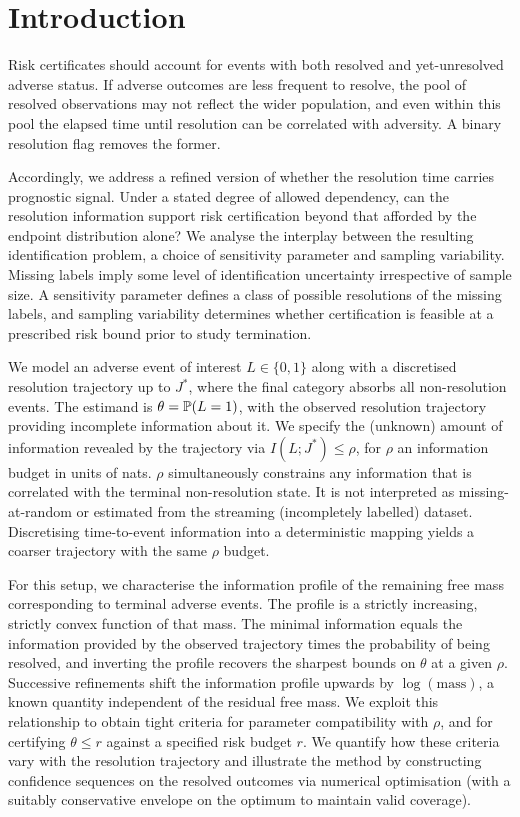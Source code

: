 \section{Introduction}\label{sec:intro} 
Risk certificates should account for events with both resolved and yet-unresolved adverse status. If adverse outcomes are less frequent to resolve, the pool of resolved observations may not reflect the wider population, and even within this pool the elapsed time until resolution can be correlated with adversity. A binary resolution flag removes the former. 

Accordingly, we address a refined version of whether the resolution time carries prognostic signal. Under a stated degree of allowed dependency, can the resolution information support risk certification beyond that afforded by the endpoint distribution alone? We analyse the interplay between the resulting identification problem, a choice of sensitivity parameter and sampling variability. Missing labels imply some level of identification uncertainty irrespective of sample size. A sensitivity parameter defines a class of possible resolutions of the missing labels, and sampling variability determines whether certification is feasible at a prescribed risk bound prior to study termination.

We model an adverse event of interest $L\in\{0,1\}$ along with a discretised resolution trajectory up to $J^*$, where the final category absorbs all non-resolution events. The estimand is $\theta = \mathbb P(L = 1)$, with the observed resolution trajectory providing incomplete information about it. We specify the (unknown) amount of information revealed by the trajectory via $I(L; J^*) \leq \rho$, for $\rho$ an information budget in units of nats. $\rho$ simultaneously constrains any information that is correlated with the terminal non-resolution state. It is not interpreted as missing-at-random or estimated from the streaming (incompletely labelled) dataset. Discretising time-to-event information into a deterministic mapping yields a coarser trajectory with the same $\rho$ budget.

For this setup, we characterise the information profile of the remaining free mass corresponding to terminal adverse events. The profile is a strictly increasing, strictly convex function of that mass. The minimal information equals the information provided by the observed trajectory times the probability of being resolved, and inverting the profile recovers the sharpest bounds on $\theta$ at a given $\rho$. Successive refinements shift the information profile upwards by $\log(\mathrm{mass})$, a known quantity independent of the residual free mass. We exploit this relationship to obtain tight criteria for parameter compatibility with $\rho$, and for certifying $\theta \leq r$ against a specified risk budget $r$. We quantify how these criteria vary with the resolution trajectory and illustrate the method by constructing confidence sequences on the resolved outcomes via numerical optimisation (with a suitably conservative envelope on the optimum to maintain valid coverage).

